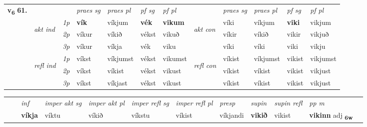 \begin{tabular}{llllllllllll} \toprule
\multirow{4}{*}{{{\textbf{v{\textsubscript{6}}} \Large{\textbf{61.}}}}}  & &   &  \textit{praes sg}  & \textit{praes pl}  &\textit{ pf sg} & \textit{pf pl} &  &  \textit{praes sg}  & \textit{praes pl}  & \textit{pf sg} & \textit{pf pl } \\*
	\cmidrule{4-7} \cmidrule{9-12}
 & \multirow{3}{*}{\begin{turn}{90}\textit{akt ind}\end{turn}} & {\textit{1p}} & \textbf{vík} & víkjum    & \textbf{vék} & \textbf{vikum} & \multirow{3}{*}{\begin{turn}{90}\textit{akt con}\end{turn}} &víki & víkjum & \textbf{viki} & vikjum\\*
& &  {\textit{2p}} &  víkur  & víkið   & vékst & vikuð & & víkir & víkið & vikir & vikjuð \\*
& &  {\textit{3p}} & víkur & víkja   & vék & viku & & víki & víki& viki & vikju  \\*
\cmidrule{4-7} \cmidrule{9-12}
 &\multirow{3}{*}{\begin{turn}{90}\textit{refl ind}\end{turn}} & {\textit{1p}} & víkst & víkjumst    & vékst & vikumst & \multirow{3}{*}{\begin{turn}{90}\textit{refl con}\end{turn}}  &víkist & víkjumst & vikist & vikjumst\\*
 &&  {\textit{2p}} &  víkst  & víkist   & vékst & vikust & &víkist & víkist & vikist & vikjust \\*
& &  {\textit{3p}} & víkst & víkjast   & vékst & vikust & & víkist & víkist& vikist & vikjust  \\*
\cmidrule{4-7} \cmidrule{9-12}
\end{tabular}


\begin{tabular}{llllllllllll}
 & & \textit{inf} & \textit{imper akt sg} & \textit{imper akt pl} & \textit{imper refl sg} & \textit{imper refl pl} & \textit{presp} & \textit{supin} & \textit{supin refl} & \textit{pp m}     \\*
  & & \textbf{víkja} & víktu  & víkið & víkstu & víkist & víkjandi &  \textbf{vikið} & vikist & \textbf{vikinn} adj \textbf{\textsubscript{6w}} \\*
\cmidrule{1-12}
\end{tabular}





